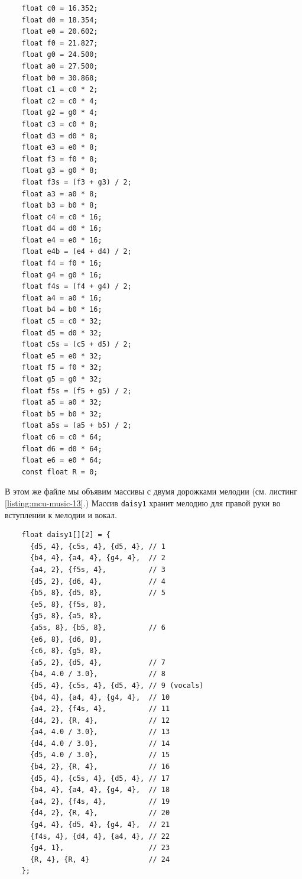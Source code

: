 \documentclass[../sparc.tex]{subfiles}
\begin{document}
\begin{listing}[ht]
  \begin{verbatim}
    float c0 = 16.352;
    float d0 = 18.354;
    float e0 = 20.602;
    float f0 = 21.827;
    float g0 = 24.500;
    float a0 = 27.500;
    float b0 = 30.868;
    float c1 = c0 * 2;
    float c2 = c0 * 4;
    float g2 = g0 * 4;
    float c3 = c0 * 8;
    float d3 = d0 * 8;
    float e3 = e0 * 8;
    float f3 = f0 * 8;
    float g3 = g0 * 8;
    float f3s = (f3 + g3) / 2;
    float a3 = a0 * 8;
    float b3 = b0 * 8;
    float c4 = c0 * 16;
    float d4 = d0 * 16;
    float e4 = e0 * 16;
    float e4b = (e4 + d4) / 2;
    float f4 = f0 * 16;
    float g4 = g0 * 16;
    float f4s = (f4 + g4) / 2;
    float a4 = a0 * 16;
    float b4 = b0 * 16;
    float c5 = c0 * 32;
    float d5 = d0 * 32;
    float c5s = (c5 + d5) / 2;
    float e5 = e0 * 32;
    float f5 = f0 * 32;
    float g5 = g0 * 32;
    float f5s = (f5 + g5) / 2;
    float a5 = a0 * 32;
    float b5 = b0 * 32;
    float a5s = (a5 + b5) / 2;
    float c6 = c0 * 64;
    float d6 = d0 * 64;
    float e6 = e0 * 64;
    const float R = 0;
  \end{verbatim}
  \caption{Ноты для второй версии мелодии ``Daisy Bell''.}
  \label{listing:mcu-music-12}
\end{listing}

\newpage
В этом же файле мы объявим массивы с двумя дорожками мелодии (см. листинг
\ref{listing:mcu-music-13}.)  Массив \texttt{daisy1} хранит мелодию для
правой руки во вступлении к мелодии и вокал.

\begin{listing}[ht]
  \begin{verbatim}
    float daisy1[][2] = {
      {d5, 4}, {c5s, 4}, {d5, 4}, // 1
      {b4, 4}, {a4, 4}, {g4, 4},  // 2
      {a4, 2}, {f5s, 4},          // 3
      {d5, 2}, {d6, 4},           // 4
      {b5, 8}, {d5, 8},           // 5
      {e5, 8}, {f5s, 8},
      {g5, 8}, {a5, 8},
      {a5s, 8}, {b5, 8},          // 6
      {e6, 8}, {d6, 8},
      {c6, 8}, {g5, 8},
      {a5, 2}, {d5, 4},           // 7
      {b4, 4.0 / 3.0},            // 8
      {d5, 4}, {c5s, 4}, {d5, 4}, // 9 (vocals)
      {b4, 4}, {a4, 4}, {g4, 4},  // 10
      {a4, 2}, {f4s, 4},          // 11
      {d4, 2}, {R, 4},            // 12
      {a4, 4.0 / 3.0},            // 13
      {d4, 4.0 / 3.0},            // 14
      {d5, 4.0 / 3.0},            // 15
      {b4, 2}, {R, 4},            // 16
      {d5, 4}, {c5s, 4}, {d5, 4}, // 17
      {b4, 4}, {a4, 4}, {g4, 4},  // 18
      {a4, 2}, {f4s, 4},          // 19
      {d4, 2}, {R, 4},            // 20
      {g4, 4}, {d5, 4}, {g4, 4},  // 21
      {f4s, 4}, {d4, 4}, {a4, 4}, // 22
      {g4, 1},                    // 23
      {R, 4}, {R, 4}              // 24
    };
  \end{verbatim}
  \caption{Массив с нотами для первой дорожки мелодии ``Daisy Bell''.}
  \label{listing:mcu-music-13}
\end{listing}
\end{document}

